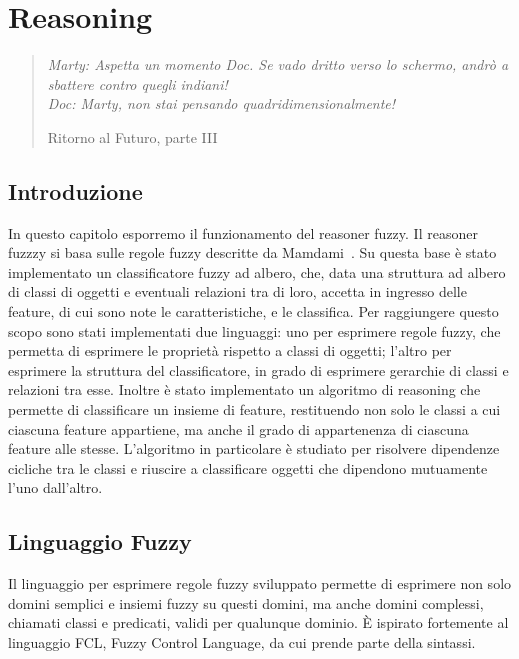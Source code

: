\chapter{Reasoning}
\label{cap:reasoning}
\thispagestyle{empty}

\begin{quotation}
{\footnotesize
\noindent \emph{Marty: Aspetta un momento Doc. Se vado dritto verso lo schermo, andrò a sbattere contro quegli indiani! \\
Doc: Marty, non stai pensando quadridimensionalmente!}
\begin{flushright}
Ritorno al Futuro, parte III
\end{flushright}
}
\end{quotation}
\vspace{0.5cm}

\section{Introduzione}

In questo capitolo esporremo il funzionamento del reasoner fuzzy. Il reasoner fuzzzy si basa sulle regole fuzzy descritte da Mamdami~\cite{mamdani1975experiment}. 
Su questa base è stato implementato un classificatore fuzzy ad albero, che, data una struttura ad albero di classi di oggetti e eventuali relazioni tra di loro, accetta in ingresso delle feature, di cui sono note le caratteristiche, e le classifica.
Per raggiungere questo scopo sono stati implementati due linguaggi: uno per esprimere regole fuzzy, che permetta di esprimere le proprietà rispetto a classi di oggetti; l'altro per esprimere la struttura del classificatore, in grado di esprimere gerarchie di classi e relazioni tra esse.
Inoltre è stato implementato un algoritmo di reasoning che permette di classificare un insieme di feature, restituendo non solo le classi a cui ciascuna feature appartiene, ma anche il grado di appartenenza di ciascuna feature alle stesse.
L'algoritmo in particolare è studiato per risolvere dipendenze cicliche tra le classi e riuscire a classificare oggetti che dipendono mutuamente l'uno dall'altro.

\section{Linguaggio Fuzzy}
Il linguaggio per esprimere regole fuzzy sviluppato permette di esprimere non solo domini semplici e insiemi fuzzy su questi domini, ma anche domini complessi, chiamati classi e predicati, validi per qualunque dominio. \`E ispirato fortemente al linguaggio FCL, Fuzzy Control Language, da cui prende parte della sintassi.

